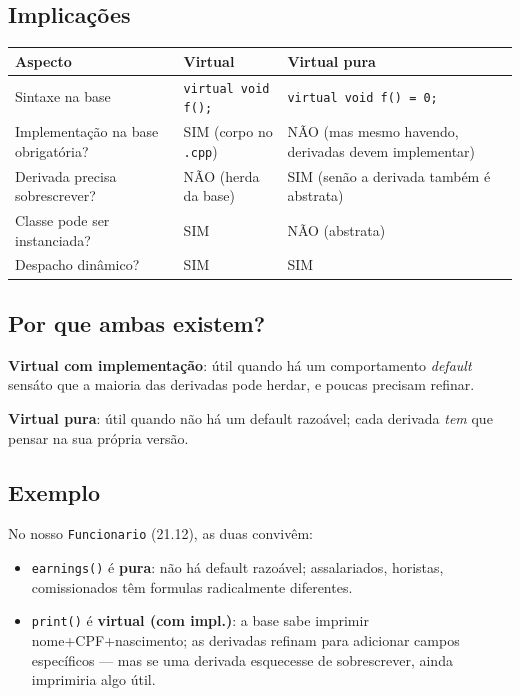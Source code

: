 \documentclass[11pt,a4paper]{article}
\begin{document}
\subsection*{Implica\c{c}\~oes}

\begin{center}
\renewcommand{\arraystretch}{1.3}
\small
\begin{tabular}{|p{4.0cm}|p{3.6cm}|p{5.6cm}|}
\hline
\textbf{Aspecto} & \textbf{Virtual} & \textbf{Virtual pura} \\
\hline
Sintaxe na base & \texttt{virtual void f();} & \texttt{virtual void f() = 0;} \\
\hline
Implementa\c{c}\~ao na base obrigat\'oria? & SIM (corpo no \texttt{.cpp}) & N\~AO (mas mesmo havendo, derivadas devem implementar) \\
\hline
Derivada precisa sobrescrever? & N\~AO (herda da base) & SIM (sen\~ao a derivada tamb\'em \'e abstrata) \\
\hline
Classe pode ser instanciada? & SIM & N\~AO (abstrata) \\
\hline
Despacho din\^amico? & SIM & SIM \\
\hline
\end{tabular}
\end{center}

\subsection*{Por que ambas existem?}

\textbf{Virtual com implementa\c{c}\~ao}: \'util quando h\'a um comportamento \emph{default} sens\'ato que a maioria das derivadas pode herdar, e poucas precisam refinar.

\textbf{Virtual pura}: \'util quando n\~ao h\'a um default razo\'avel; cada derivada \emph{tem} que pensar na sua pr\'opria vers\~ao.

\subsection*{Exemplo}

No nosso \texttt{Funcionario} (21.12), as duas conviv\^em:

\begin{itemize}[leftmargin=*,itemsep=0pt]
  \item \texttt{earnings()} \'e \textbf{pura}: n\~ao h\'a default razo\'avel; assalariados, horistas, comissionados t\^em formulas radicalmente diferentes.
  \item \texttt{print()} \'e \textbf{virtual (com impl.)}: a base sabe imprimir nome+CPF+nascimento; as derivadas refinam para adicionar campos espec\'ificos --- mas se uma derivada esquecesse de sobrescrever, ainda imprimiria algo \'util.
\end{itemize}
\end{document}
